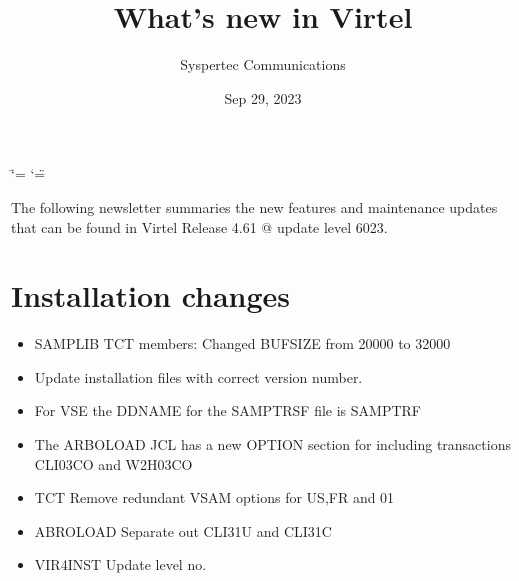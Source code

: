 \documentclass[letterpaper,10pt,english]{sphinxmanual}
\title{What's new in Virtel}
\date{Sep 29, 2023}
\author{Syspertec Communications}
\begin{document}
\ifdefined\shorthandoff
  \ifnum\catcode`\=\string=\active\shorthandoff{=}\fi
  \ifnum\catcode`\"=\active{}\fi
\fi

\pagestyle{empty}
\sphinxmaketitle
\pagestyle{plain}
\sphinxtableofcontents
\pagestyle{normal}
\label{\detokenize{TN202303::doc}}


\sphinxAtStartPar
The following newsletter summaries the new features and maintenance updates that can be found in Virtel Release 4.61 @ update level 6023.


\chapter{Installation changes}
\label{\detokenize{TN202303:installation-changes}}
\sphinxAtStartPar
{}
\begin{itemize}
\item {} 
\sphinxAtStartPar
SAMPLIB TCT members: Changed BUFSIZE from 20000 to 32000

\end{itemize}

\sphinxAtStartPar
{}
\begin{itemize}
\item {} 
\sphinxAtStartPar
Update installation files with correct version number.

\end{itemize}

\sphinxAtStartPar
{}
\begin{itemize}
\item {} 
\sphinxAtStartPar
For VSE the DDNAME for the SAMPTRSF file is SAMPTRF

\end{itemize}

\sphinxAtStartPar
{}
\begin{itemize}
\item {} 
\sphinxAtStartPar
The ARBOLOAD JCL has a new OPTION section for including transactions CLI\sphinxhyphen{}03CO and W2H\sphinxhyphen{}03CO

\end{itemize}

\sphinxAtStartPar
{}
\begin{itemize}
\item {} 
\sphinxAtStartPar
TCT                           Remove redundant VSAM options for US,FR and 01

\item {} 
\sphinxAtStartPar
ABROLOAD                  Separate out CLI\sphinxhyphen{}31U and CLI\sphinxhyphen{}31C

\item {} 
\sphinxAtStartPar
VIR4INST                  Update level no.

\end{itemize}
\end{document}
